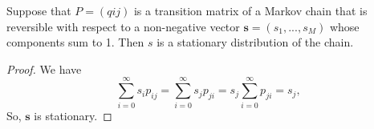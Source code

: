 \begin{proposition}
    Suppose that $P = (qij)$ is
a transition matrix of a Markov chain that is reversible with respect to a non-negative vector 
$\mathbf{s} = (s_1, . . . , s_M)$ whose components sum to 1. Then $s$ is a stationary distribution of the chain.
\end{proposition}
\begin{proof}
    We have 
    \[
        \sum_{i=0}^{\infty} s_{i}p_{ij} = \sum_{i=0}^{\infty} s_{j}p_{ji} = s_{j}\sum_{i=0}^{\infty} p_{ji} = s_{j},
    \]
    So, $ \mathbf{s} $ is stationary.
\end{proof}
